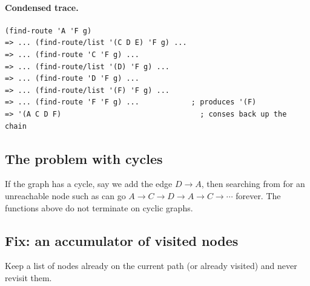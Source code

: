 \paragraph{Condensed trace.}
\begin{lstlisting}[style=racket]
(find-route 'A 'F g)
=> ... (find-route/list '(C D E) 'F g) ...
=> ... (find-route 'C 'F g) ...
=> ... (find-route/list '(D) 'F g) ...
=> ... (find-route 'D 'F g) ...
=> ... (find-route/list '(F) 'F g) ...
=> ... (find-route 'F 'F g) ...            ; produces '(F)
=> '(A C D F)                                ; conses back up the chain
\end{lstlisting}

\subsection{The problem with cycles}
If the graph has a cycle, say we add the edge $D \to A$, then searching from
 for an unreachable node such as  can go
$A \to C \to D \to A \to C \to \cdots$ forever. The functions above do not
terminate on cyclic graphs.

\begin{center}
\end{center}

\subsection{Fix: an accumulator of visited nodes}
Keep a list of nodes already on the current path (or already visited) and
never revisit them.

